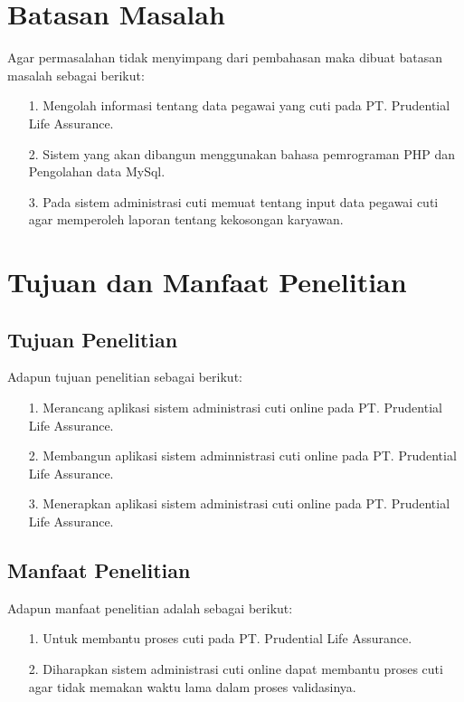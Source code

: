 \documentclass{jtetiproposalskripsi}
\begin{document}
\section{Batasan Masalah}
Agar permasalahan tidak menyimpang dari pembahasan maka dibuat batasan masalah sebagai berikut:
\begin{itemize}
\item[1.] Mengolah informasi tentang data pegawai yang cuti pada PT. Prudential Life Assurance.
\item[2.] Sistem yang akan dibangun menggunakan bahasa pemrograman PHP dan Pengolahan data MySql.
\item[3.] Pada sistem administrasi cuti memuat tentang input data pegawai cuti agar memperoleh laporan tentang kekosongan karyawan.
\end{itemize}

\section{Tujuan dan Manfaat Penelitian}	
\subsection{Tujuan Penelitian}
Adapun tujuan penelitian sebagai berikut:
\begin{itemize}
\item[1.]Merancang aplikasi sistem administrasi cuti online pada PT. Prudential Life Assurance.
\item[2.]Membangun aplikasi sistem adminnistrasi cuti online pada PT. Prudential Life Assurance.
\item[3.]Menerapkan aplikasi sistem administrasi cuti online pada PT. Prudential Life Assurance.

\end{itemize}
\subsection{Manfaat Penelitian}
Adapun manfaat penelitian adalah sebagai berikut:
\begin{itemize}
\item[1.]Untuk membantu proses cuti pada PT. Prudential Life Assurance.
\item[2.]Diharapkan sistem administrasi cuti online dapat membantu proses cuti agar tidak memakan waktu 			 lama dalam proses validasinya.
\end{itemize}
\end{document}
